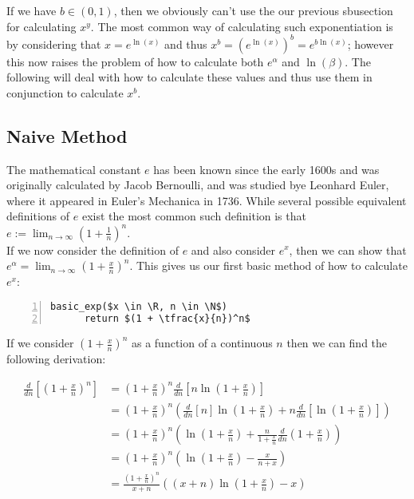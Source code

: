 If we have \(b \in (0, 1)\), then we obviously can't use the our previous sbusection for calculating \(x^y\). The most common way of calculating such exponentiation is by considering that \(x = e^{\ln(x)}\) and thus \(x^b = (e^{\ln(x)})^b = e^{b\ln(x)}\); however this now raises the problem of how to calculate both \(e^\alpha\) and \(\ln(\beta)\). The following will deal with how to calculate these values and thus use them in conjunction to calculate \(x^b\).\\

\subsection{Naive Method}

The mathematical constant \(e\) has been known since the early 1600s and was originally calculated by Jacob Bernoulli, and was studied bye Leonhard Euler, where it appeared in Euler's Mechanica in 1736. While several possible equivalent definitions of \(e\) exist the most common such definition is that \(e := \lim_{n \to \infty}(1 + \tfrac{1}{n})^n\).\\

If we now consider the definition of \(e\) and also consider \(e^x\), then we can show that \(e^\alpha = \lim_{n\to\infty}(1+\tfrac{x}{n})^n\). This gives us our first basic method of how to calculate \(e^x\):

\begin{lstlisting}[numbers=left,frame=single,mathescape,caption={Baisc Method for calculating \(e^\alpha\)},label={PCD_"basic exp"}]
  basic_exp($x \in \R, n \in \N$)
      return $(1 + \tfrac{x}{n})^n$
\end{lstlisting}

If we consider \((1+\tfrac{x}{n})^n\) as a function of a continuous \(n\) then we can find the following derivation:

\begin{align*}
	\frac{d}{dn}\left[(1 + \frac{x}{n})^n\right]
		&= (1+\frac{x}{n})^n\frac{d}{dn}\left[n\ln(1+\frac{x}{n})\right]\\
	&= (1+\frac{x}{n})^n(\frac{d}{dn}[n]\ln(1+\frac{x}{n}) 
		+ n\frac{d}{dn}\left[\ln(1+\frac{x}{n})\right])\\
	&=(1+\frac{x}{n})^n(\ln(1+\frac{x}{n}) 
		+ \frac{n}{1 + \frac{x}{n}}\frac{d}{dn}(1 + \frac{x}{n}))\\
	&=(1+\frac{x}{n})^n(\ln(1+\frac{x}{n}) - \frac{x}{n + x})\\
	&=\frac{(1+\frac{x}{n})^n}{x + n}((x + n)\ln(1 + \frac{x}{n}) - x)
\end{align*}

